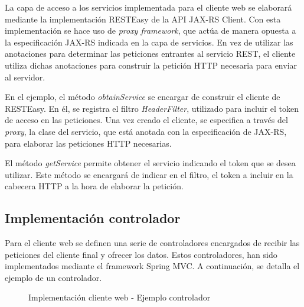 La capa de acceso a los servicios implementada para el cliente web se elaborará mediante la implementación RESTEasy de la API JAX-RS Client. Con esta implementación se hace uso de \textit{proxy framework}, que actúa de manera opuesta a la especificación JAX-RS indicada en la capa de servicios. En vez de utilizar las anotaciones para determinar las peticiones entrantes al servicio REST, el cliente utiliza dichas anotaciones para construir la petición HTTP necesaria para enviar al servidor.

En el ejemplo, el método \textit{obtainService} se encargar de construir el cliente de RESTEasy. En él, se registra el filtro \textit{HeaderFilter}, utilizado para incluir el token de acceso en las peticiones. Una vez creado el cliente, se especifica a través del \textit{proxy}, la clase del servicio, que está anotada con la especificación de JAX-RS, para elaborar las peticiones HTTP necesarias.

El método \textit{getService} permite obtener el servicio indicando el token que se desea utilizar. Este método se encargará de indicar en el filtro, el token a incluir en la cabecera HTTP a la hora de elaborar la petición.


\subsection{Implementación controlador}
Para el cliente web se definen una serie de controladores encargados de recibir las peticiones del cliente final y ofrecer los datos. Estos controladores, han sido implementados mediante el framework Spring MVC. A continuación, se detalla el ejemplo de un controlador.

\begin{figure}[H]
\centering
{}
\caption{Implementación cliente web - Ejemplo controlador}
\end{figure}

